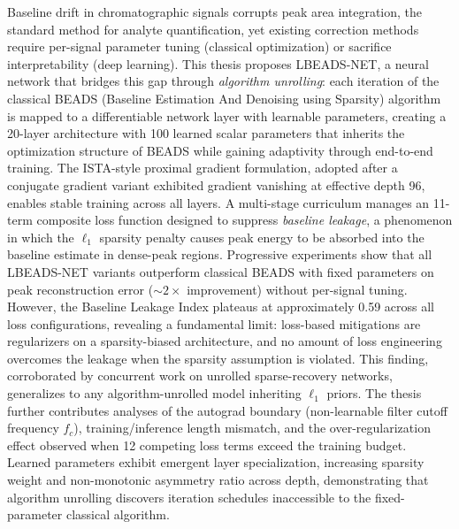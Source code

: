 
Baseline drift in chromatographic signals corrupts peak area integration, the standard method for analyte quantification, yet existing correction methods require per-signal parameter tuning (classical optimization) or sacrifice interpretability (deep learning). This thesis proposes LBEADS-NET, a neural network that bridges this gap through \emph{algorithm unrolling}: each iteration of the classical BEADS (Baseline Estimation And Denoising using Sparsity) algorithm is mapped to a differentiable network layer with learnable parameters, creating a 20-layer architecture with 100 learned scalar parameters that inherits the optimization structure of BEADS while gaining adaptivity through end-to-end training. The ISTA-style proximal gradient formulation, adopted after a conjugate gradient variant exhibited gradient vanishing at effective depth 96, enables stable training across all layers. A multi-stage curriculum manages an 11-term composite loss function designed to suppress \emph{baseline leakage}, a phenomenon in which the $\ell_1$ sparsity penalty causes peak energy to be absorbed into the baseline estimate in dense-peak regions. Progressive experiments show that all LBEADS-NET variants outperform classical BEADS with fixed parameters on peak reconstruction error (${\sim}2\times$ improvement) without per-signal tuning. However, the Baseline Leakage Index plateaus at approximately 0.59 across all loss configurations, revealing a fundamental limit: loss-based mitigations are regularizers on a sparsity-biased architecture, and no amount of loss engineering overcomes the leakage when the sparsity assumption is violated. This finding, corroborated by concurrent work on unrolled sparse-recovery networks, generalizes to any algorithm-unrolled model inheriting $\ell_1$ priors. The thesis further contributes analyses of the autograd boundary (non-learnable filter cutoff frequency $f_c$), training/inference length mismatch, and the over-regularization effect observed when 12 competing loss terms exceed the training budget. Learned parameters exhibit emergent layer specialization, increasing sparsity weight and non-monotonic asymmetry ratio across depth, demonstrating that algorithm unrolling discovers iteration schedules inaccessible to the fixed-parameter classical algorithm.
